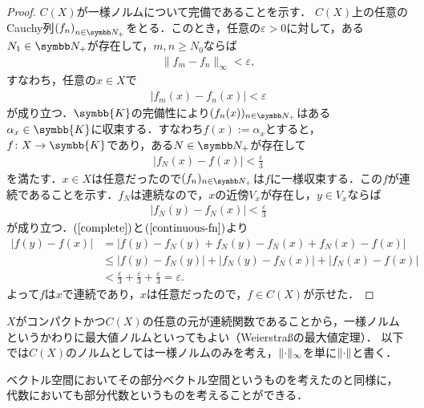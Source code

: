 \documentclass[../main.tex]{subfiles}
\begin{document}
\begin{proof}
\(C(X)\)が一様ノルムについて完備であることを示す．
\(C(X)\)上の任意のCauchy列\(\Sequence{f}\)をとる．このとき，任意の\(\varepsilon > 0\)に対して，ある\(N_1 \in \PositiveInteger\)が存在して，\(m, n \geq N_0\)ならば
\begin{align*}
  \lVert f_m - f_n \rVert_\infty < \varepsilon,
\end{align*}
すなわち，任意の\(x \in X\)で
\begin{align*}
  \lvert f_m(x) - f_n(x) \rvert < \varepsilon
\end{align*}
が成り立つ．\(\symbb{K}\)の完備性により\((f_n(x))_{n \in \PositiveInteger}\)はある\(\alpha_x \in \symbb{K}\)に収束する．すなわち\(f(x) := \alpha_x\)とすると，\(f\colon X \to \symbb{K}\)であり，ある\(N \in \PositiveInteger\)が存在して
\begin{align}
  |f_N(x) - f(x)| < \frac{\varepsilon}{3}
  \label{complete}
\end{align}
を満たす．\(x \in X\)は任意だったので\((f_n)_{n \in \PositiveInteger}\)は\(f\)に一様収束する．この\(f\)が連続であることを示す．\(f_N\)は連続なので，\(x\)の近傍\(V_x\)が存在し，\(y \in V_x\)ならば
\begin{align}
  \lvert f_N(y) - f_N(x) \rvert < \frac{\varepsilon}{3}
  \label{continuous-fn}
\end{align}
が成り立つ．\((\ref{complete})\)と\((\ref{continuous-fn})\)より
\begin{align*}
  \lvert f(y) - f(x) \rvert
  &= \lvert f(y) - f_N(y) + f_N(y) - f_N(x) + f_N(x) - f(x) \rvert \\
  &\leq |f(y) - f_N(y)| + |f_N(y) - f_N(x)| + |f_N(x) - f(x)| \\
  &< \frac{\varepsilon}{3} + \frac{\varepsilon}{3} + \frac{\varepsilon}{3} = \varepsilon.
\end{align*}
よって\(f\)は\(x\)で連続であり，\(x\)は任意だったので，\(f \in C(X)\)が示せた．
\end{proof}

\(X\)がコンパクトかつ\(C(X)\)の任意の元が連続関数であることから，一様ノルムというかわりに最大値ノルムといってもよい（Weierstraßの最大値定理）．
以下では\(C(X)\)のノルムとしては一様ノルムのみを考え，\(\lVert \mathord{\cdot} \rVert_\infty\)を単に\(\lVert \mathord{\cdot} \rVert\)と書く．

ベクトル空間においてその部分ベクトル空間というものを考えたのと同様に，
代数においても部分代数というものを考えることができる．
\end{document}
